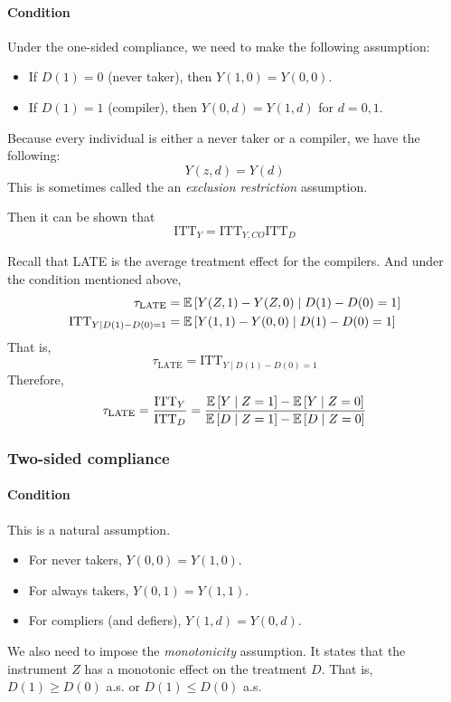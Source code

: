 \paragraph{Condition}
Under the one-sided compliance, we need to make the following assumption:
\begin{itemize}
    \item If $D(1)=0$ (never taker), then $Y(1,0)=Y(0,0)$.
    \item If $D(1)=1$ (compiler), then $Y(0,d)=Y(1,d)$ for $d=0,1$.
\end{itemize}
Because every individual is either a never taker or a compiler, we have the following:$$Y(z,d)=Y(d)$$ This is sometimes called the an \textit{exclusion restriction} assumption.

Then it can be shown that \begin{equation*}
    \text{ITT}_Y = \text{ITT}_{Y,CO}\text{ITT}_D
\end{equation*}

Recall that LATE is the average treatment effect for the compilers. And under
the condition mentioned above,
\begin{align*}
    \tau_{\text{LATE}}               & = \mathbb{E}\left[Y(Z,1)-Y(Z,0)\mid D(1)-D(0)=1\right] \\
    \text{ITT}_{Y\mid {D(1)-D(0)=1}} & =\mathbb{E}\left[Y(1,1)-Y(0,0)\mid D(1)-D(0)=1\right]
\end{align*}
That is, \begin{equation*}
    \tau_{\text{LATE}} = \text{ITT}_{Y\mid {D(1)-D(0)=1}}
\end{equation*}
Therefore,
\begin{equation*}
    \tau_{\text{LATE}} = \frac{\text{ITT}_Y}{\text{ITT}_D} =  \frac{\mathbb{E}\left[Y \mid Z=1\right]-\mathbb{E}\left[Y\mid Z=0\right]}{\mathbb{E}\left[D\mid Z=1\right]-\mathbb{E}\left[D\mid Z=0\right]}
\end{equation*}

\subsubsection{Two-sided compliance}
\paragraph{Condition} This is a natural assumption.
\begin{itemize}
    \item For never takers, $Y(0,0)=Y(1,0)$.
    \item For always takers, $Y(0,1)=Y(1,1)$.
    \item For compliers (and defiers), $Y(1,d)=Y(0,d)$.
\end{itemize}
We also need to impose the \emph{monotonicity} assumption. It states that the instrument $Z$ has a monotonic effect on the treatment $D$. That is, $D(1)\ge D(0)$ a.s. or $D(1)\le D(0)$ a.s.

